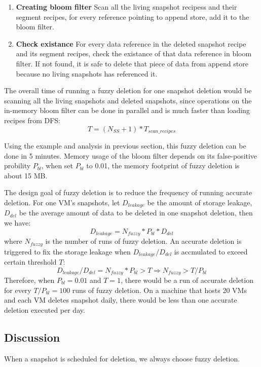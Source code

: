 \begin{enumerate}
\item {\bf Creating bloom filter} Scan all the living snapshot recipess and their segment recipes,
for every reference pointing to append store, add it to the bloom filter.
\item {\bf Check existance} For every data reference in the deleted snapshot recipe and its segment recipes,
check the existance of that data reference in bloom filter. If not found, it is safe to delete that piece of data from append store
because no living snapshots has referenced it.
\end{enumerate}

The overall time of running a fuzzy deletion for one snapshot deletion would be scanning
all the living snapshots and deleted snapshots, since operations on the in-memory bloom filter can be done in
parallel and is much faster than loading recipes from DFS:
\begin{equation}
T = (N_{SS} + 1) * T_{scan\_recipes}
\end{equation}
 
Using the example and analysis in previous section, this fuzzy deletion can be done in 5 minutes. 
Memory usage of the bloom filter depends on its false-positive probility $P_{bl}$,
when set $P_{bl}$ to 0.01, the memory footprint of fuzzy deletion is about 15 MB.

The design goal of fuzzy deletion is to reduce the frequency of running accurate deletion.
For one VM's snapshots, let $D_{leakage}$ be the amount of storage leakage, $D_{del}$ be the average amount of data
to be deleted in one snapshot deletion, 
then we have:
\begin{equation}
D_{leakage} = N_{fuzzy} * P_{bl} * D_{del}
\end{equation}
where $N_{fuzzy}$ is the number of runs of fuzzy deletion. 
An accurate deletion is triggered to fix the storage leakage
when $D_{leakage}/D_{del}$ is accmulated to exceed certain threshold $T$:
\begin{equation}
D_{leakage} / D_{del} = N_{fuzzy} * P_{bl} > T \Rightarrow N_{fuzzy} > T/P_{bl}
\end{equation}
Therefore, when $P_{bl} = 0.01$ and $T=1$, 
there would be a run of accurate deletion for every $T/P_{bl} = 100$ runs of fuzzy deletion.
On a machine that hosts 20 VMs and each VM deletes snapshot daily, there would be less than
one accurate deletion executed per day.

\subsection{Discussion}
When a snapshot is scheduled for deletion, we always choose fuzzy deletion.
